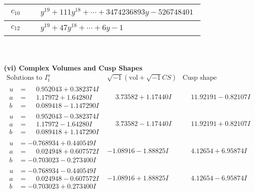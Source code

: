 \documentclass[1p]{elsarticle_modified}
\theoremstyle{definition}
\newcommand{\I}{\sqrt{-1}}
\begin{document}
\begin{tabular}{m{50pt}|m{274pt}}
\hline $$\begin{aligned}c_{10}\end{aligned}$$&$\begin{aligned}
&y^{19}+111 y^{18}+\cdots+3474236893 y-526748401
\end{aligned}$\\
\hline $$\begin{aligned}c_{12}\end{aligned}$$&$\begin{aligned}
&y^{19}+47 y^{18}+\cdots+6 y-1
\end{aligned}$\\
\hline
\end{tabular}\\~\\
\newpage\flushleft \textbf{(vi) Complex Volumes and Cusp Shapes}
$$\begin{array}{c|c|c}  
\text{Solutions to }I^u_{1}& \I (\text{vol} + \sqrt{-1}CS) & \text{Cusp shape}\\
 \hline 
\begin{aligned}
u &= \phantom{-}0.952043 + 0.382374 I \\
a &= \phantom{-}1.17972 + 1.64280 I \\
b &= \phantom{-}0.089418 - 1.147290 I\end{aligned}
 & \phantom{-}3.73582 + 1.17440 I & \phantom{-}11.92191 - 0.82107 I \\ \hline\begin{aligned}
u &= \phantom{-}0.952043 - 0.382374 I \\
a &= \phantom{-}1.17972 - 1.64280 I \\
b &= \phantom{-}0.089418 + 1.147290 I\end{aligned}
 & \phantom{-}3.73582 - 1.17440 I & \phantom{-}11.92191 + 0.82107 I \\ \hline\begin{aligned}
u &= -0.768934 + 0.440549 I \\
a &= \phantom{-}0.024948 + 0.607572 I \\
b &= -0.703023 - 0.273400 I\end{aligned}
 & -1.08916 - 1.88825 I & \phantom{-}4.12654 + 6.95874 I \\ \hline\begin{aligned}
u &= -0.768934 - 0.440549 I \\
a &= \phantom{-}0.024948 - 0.607572 I \\
b &= -0.703023 + 0.273400 I\end{aligned}
 & -1.08916 + 1.88825 I & \phantom{-}4.12654 - 6.95874 I \\ \hline\begin{aligned}

\end{aligned}
\end{array}$$
\end{document}
